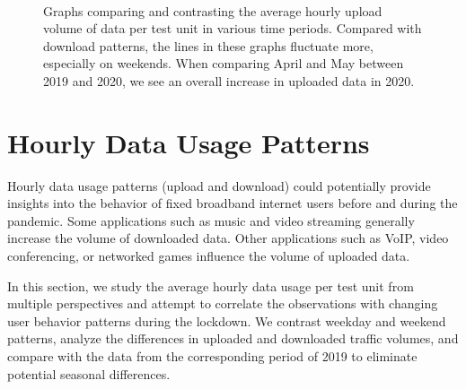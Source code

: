 \begin{figure}[th]
{    }
    \\
    \hspace*{\fill}

    \caption{Graphs comparing and contrasting the average hourly upload volume of data per test unit in various time periods. Compared with download patterns, the lines in these graphs fluctuate more, especially on weekends. When comparing April and May between 2019 and 2020, we see an overall increase in uploaded data in 2020.}
  \label{fig:upload_data_per_user_hours_fig}
\end{figure}


\section{Hourly Data Usage Patterns}
\label{sec:hourly-data-usage-patterns}

Hourly data usage patterns (upload and download) could potentially provide insights into the behavior of fixed broadband internet users before and during the pandemic. Some applications such as music and video streaming generally increase the volume of downloaded data. Other applications such as VoIP, video conferencing, or networked games influence the volume of uploaded data.

In this section, we study the average hourly data usage per test unit from multiple perspectives and attempt to correlate the observations with changing user behavior patterns during the lockdown. We contrast weekday and weekend patterns, analyze the differences in uploaded and downloaded traffic volumes, and compare with the data from the corresponding period of 2019 to eliminate potential seasonal differences.


